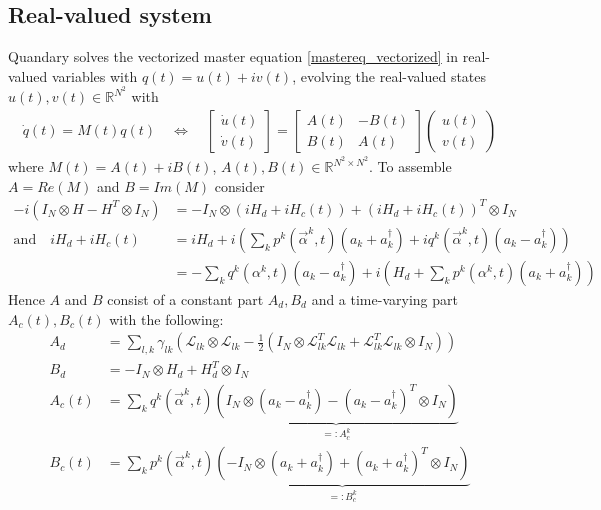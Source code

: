 \documentclass[letterpaper]{article}
\newcommand{\Ell}{\mathcal{L}}
\newcommand{\R}{\mathds{R}}
\begin{document}
  \subsection{Real-valued system}
   Quandary solves the vectorized master equation \eqref{mastereq_vectorized} in
   real-valued variables with $q(t) = u(t) + iv(t)$, evolving the real-valued
   states $u(t), v(t)\in \R^{N^2}$ with
   \begin{align}
     \dot q(t) = M(t) q(t) \quad \Leftrightarrow \quad \begin{bmatrix} \dot u(t) \\ \dot v(t) \end{bmatrix} = 
   \begin{bmatrix} A(t) & -B(t) \\ B(t) & A(t) \end{bmatrix} 
   \begin{pmatrix} u(t) \\ v(t) \end{pmatrix} 
   \label{realvaluedODE}
   \end{align}
   where $M(t) = A(t) + i B(t)$, $A(t), B(t)\in \R^{N^2\times N^2}$. To assemble
   $A = Re(M)$ and $B = Im(M)$ consider
   \begin{align}
     -i(I_N \otimes H - H^T \otimes I_N) &= -I_N \otimes \left(iH_d +
     iH_c(t)\right) + \left(iH_d + iH_c(t)\right)^T \otimes I_N \\
     \text{and} \quad iH_d + iH_c(t) &= i H_d + i\left( \sum_k
     p^k(\vec{\alpha}^k,t)(a_k + a_k^{\dagger}) + iq^k(\vec{\alpha}^k,t)(a_k -
     a_k^{\dagger})\right) \\
                    &= - \sum_k q^k(\alpha^k,t)(a_k - a_k^{\dagger}) + i\left(
                    H_d + \sum_k p^k(\alpha^k,t)(a_k+a_k^{\dagger}) \right) 
   \end{align}
   Hence $A$ and $B$ consist of a constant part $A_d, B_d$ and a time-varying
   part $A_c(t), B_c(t)$ with the following:
   \begin{align}
     A_d &=  \sum_{l,k}\gamma_{lk} \left( \Ell_{lk}\otimes\Ell_{lk} -
     \frac 1 2 \left(I_N \otimes \Ell_{lk}^T\Ell_{lk} +
     \Ell_{lk}^T\Ell_{lk}\otimes I_N\right) \right)\\
     B_d &= -I_N \otimes H_d + H_d^T \otimes I_N \\
     A_c(t) &= \sum_k q^k(\vec{\alpha}^k,t) \underbrace{\left( I_N \otimes
     \left(a_k - a_k^{\dagger}\right) - \left(a_k -
     a_k^{\dagger}\right)^T\otimes I_N \right)}_{=:A_c^k} \\
     B_c(t) &= \sum_k p^k(\vec{\alpha}^k,t) \underbrace{\left( - I_N \otimes
     \left(a_k + a_k^{\dagger}\right) + \left(a_k +
     a_k^{\dagger}\right)^T\otimes I_N \right)}_{=:B_c^k} 
   \end{align}
\end{document}
